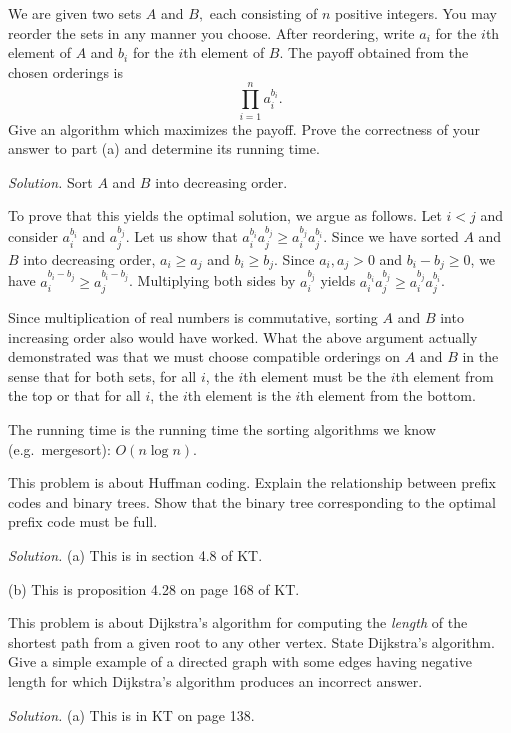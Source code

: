 \documentclass[10pt,reqno]{amsart}
\begin{document}
\begin{outline}[enumerate]
\medskip

\1 We are given two sets $A$ and $B,$ each consisting of $n$ positive integers.
You may reorder the sets in any manner you choose. After reordering, write
$a_i$ for the $i$th element of $A$ and $b_i$ for the $i$th element of $B$. The
payoff obtained from the chosen orderings is \[\prod_{i=1}^n a_i^{b_i}.\]
\2 Give an algorithm which maximizes the payoff.
\2 Prove the correctness of your answer to part (a) and determine its running
time.

\medskip
\noindent \emph{Solution.} Sort $A$ and $B$ into decreasing order.
\medskip

To prove that this yields the optimal solution, we argue as follows. Let $i <
j$ and consider $a_i^{b_i}$ and $a_j^{b_j}$. Let us show that
$a_i^{b_i}a_j^{b_j} \ge a_i^{b_j}a_j^{b_i}$. Since we have sorted $A$ and $B$
into decreasing order, $a_i \ge a_j$ and $b_i \ge b_j$. Since $a_i, a_j > 0$
and $b_i-b_j \ge 0$, we have $a_i^{b_i-b_j} \ge a_j^{b_i-b_j}$. Multiplying
both sides by $a_i^{b_j}$ yields $a_i^{b_i}a_j^{b_j} \ge a_i^{b_j}a_j^{b_i}$.

\medskip
Since multiplication of real numbers is commutative, sorting $A$ and $B$ into
increasing order also would have worked.  What the above argument actually
demonstrated was that we must choose compatible orderings on $A$ and $B$ in the
sense that for both sets, for all $i$, the $i$th element must be the $i$th
element from the top or that for all $i$, the $i$th element is the $i$th
element from the bottom.

\medskip
The running time is the running time the sorting algorithms we know
(e.g.~mergesort): $O(n\log n)$.

\medskip
\1 This problem is about Huffman coding.
\2 Explain the relationship between prefix codes and binary trees.
\2 Show that the binary tree corresponding to the optimal prefix code must be full.

\medskip
\noindent \emph{Solution.} (a) This is in section 4.8 of KT.

(b) This is proposition 4.28 on page 168 of KT.

\medskip
\1 This problem is about Dijkstra's algorithm for computing the \emph{length}
of the shortest path from a given root to any other vertex.
\2 State Dijkstra's algorithm.
\2 Give a simple example of a directed graph with some edges having negative
length for which Dijkstra's algorithm produces an incorrect answer.

\medskip
\noindent \emph{Solution.} (a) This is in KT on page 138.


\end{outline}
\end{document}
